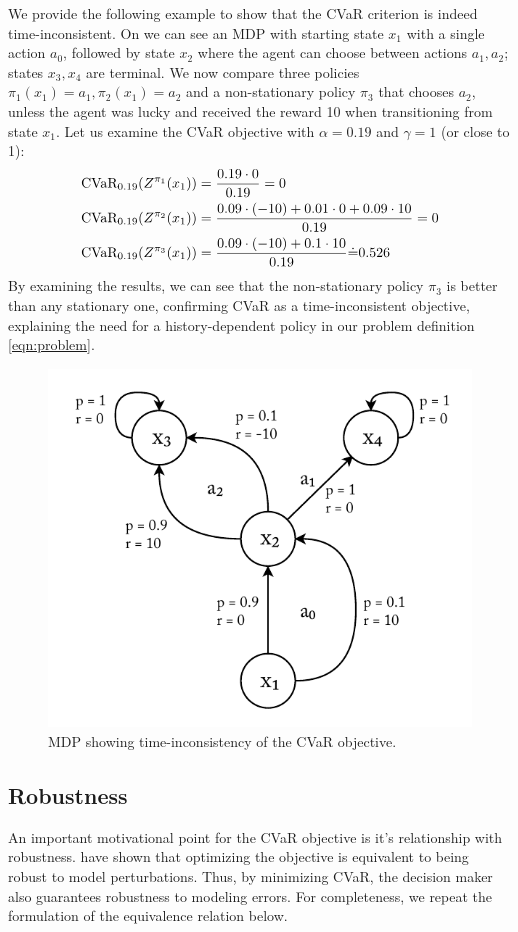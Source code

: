 We provide the following example to show that the CVaR criterion is indeed time-inconsistent. On  we can see an MDP with starting state $x_1$ with a single action $a_0$, followed by state $x_2$ where the agent can choose between actions $a_1, a_2$; states $x_3, x_4$ are terminal. We now compare three policies $\pi_1(x_1)=a_1, \pi_2(x_1)=a_2$ and a non-stationary policy $\pi_3$ that chooses $a_2$, unless the agent was lucky and received the reward 10 when transitioning from state $x_1$.
Let us examine the CVaR objective with $\alpha=0.19$ and $\gamma=1$ (or close to 1):
\begin{align*}
&\text{CVaR}_{0.19}(Z^{\pi_1}(x_1))=\frac{0.19 \cdot 0}{0.19} = 0\\
&\text{CVaR}_{0.19}(Z^{\pi_2}(x_1))=\frac{0.09\cdot (-10) + 0.01 \cdot 0 + 0.09 \cdot 10}{0.19}=0\\
&\text{CVaR}_{0.19}(Z^{\pi_3}(x_1))=\frac{0.09 \cdot (-10)+ 0.1 \cdot 10}{0.19} \dot{=} 0.526
\end{align*}
By examining the results, we can see that the non-stationary policy $\pi_3$ is better than any stationary one, confirming CVaR as a time-inconsistent objective, explaining the need for a history-dependent policy in our problem definition \ref{eqn:problem}.

\begin{figure}
\center
\includegraphics[width=0.6\linewidth]{gfx/time.pdf}
\caption{MDP showing time-inconsistency of the CVaR objective.}
\label{fig:time-consistency}
\end{figure}

\subsection{Robustness}

An important motivational point for the CVaR objective  is it's relationship with robustness. \citet{chow2015risk} have shown that optimizing the objective is equivalent to being robust to model perturbations. Thus, by minimizing CVaR, the decision maker also guarantees robustness to modeling errors. For completeness, we repeat the formulation of the equivalence relation below.

